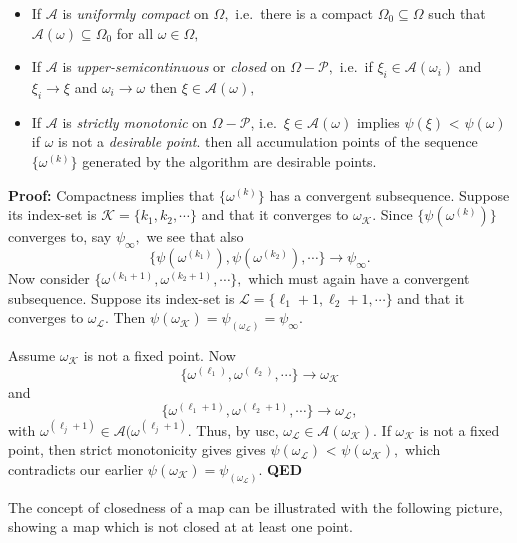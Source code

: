 \documentclass[
  12pt,
]{book}
\providecommand{\tightlist}{%
  \setlength{\itemsep}{0pt}\setlength{\parskip}{0pt}}
\begin{document}
\begin{itemize}
\tightlist
\item
  If \(\mathcal{A}\) is \emph{uniformly compact} on \(\Omega,\)
  i.e.~there is a compact \(\Omega_0\subseteq\Omega\)
  such that \(\mathcal{A}(\omega)\subseteq\Omega_0\) for all \(\omega\in\Omega,\)
\item
  If \(\mathcal{A}\) is \emph{upper-semicontinuous} or \emph{closed} on \(\Omega-\mathcal{P},\)
  i.e.~if \(\xi_i\in\mathcal{A}(\omega_i)\)
  and \(\xi_i\rightarrow\xi\)
  and \(\omega_i\rightarrow\omega\)
  then \(\xi\in\mathcal{A}(\omega),\)
\item
  If \(\mathcal{A}\) is \emph{strictly monotonic} on \(\Omega-\mathcal{P}\),
  i.e.~\(\xi\in\mathcal{A}(\omega)\)
  implies \(\psi(\xi)\) \textless{} \(\psi(\omega)\) if \(\omega\)
  is not a \emph{desirable point}.
  then
  all accumulation points of
  the sequence \(\{\omega^{(k)}\}\) generated by the algorithm are desirable
  points.
\end{itemize}

\textbf{Proof:}
Compactness implies that \(\{\omega^{(k)}\}\) has a convergent subsequence. Suppose its index-set
is \(\mathcal{K}=\{k_1,k_2,\cdots\}\) and that it converges to \(\omega_\mathcal{K}.\)
Since \(\{\psi(\omega^{(k)})\}\) converges to, say \(\psi_\infty,\)
we see that also
\[
\{\psi(\omega^{(k_1)}),\psi(\omega^{(k_2)}),\cdots\}
\rightarrow\psi_\infty.
\]
Now consider \(\{\omega^{(k_1+1)},\omega^{(k_2+1)},\cdots\},\)
which must again have a convergent subsequence. Suppose its index-set
is \(\mathcal{L}=\{\ell_1+1,\ell_2+1,\cdots\}\) and that it converges to \(\omega_\mathcal{L}.\)
Then \(\psi(\omega_\mathcal{K})=\psi_(\omega_\mathcal{L})=\psi_\infty.\)

Assume \(\omega_\mathcal{K}\) is not a fixed point. Now
\[
\{\omega^{(\ell_1)},\omega^{(\ell_2)},\cdots\}
\rightarrow \omega_\mathcal{K}
\]
and
\[
\{\omega^{(\ell_1+1)},\omega^{(\ell_2+1)},\cdots\}
\rightarrow\omega_\mathcal{L},
\]
with \(\omega^{(\ell_j+1)}\in\mathcal{A}(\omega^{(\ell_j+1)}.\) Thus, by
usc, \(\omega_\mathcal{L}\in\mathcal{A}(\omega_\mathcal{K}).\)
If \(\omega_\mathcal{K}\) is not a fixed point, then strict monotonicity gives gives \(\psi(\omega_\mathcal{L})\) \textless{} \(\psi(\omega_\mathcal{K}),\) which contradicts our earlier \(\psi(\omega_\mathcal{K})=\psi_(\omega_\mathcal{L}).\)
\textbf{QED}

The concept of closedness of a map can be illustrated with the
following picture, showing a map which is not closed at at least
one point.
\end{document}
